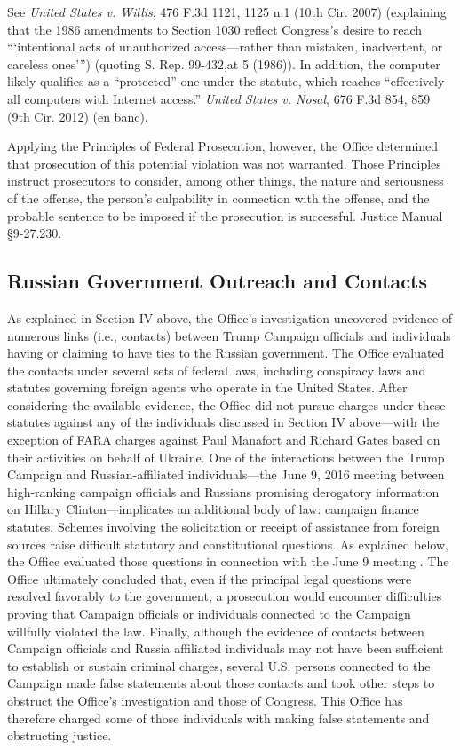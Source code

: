 See \textit{United States v. Willis}, 476 F.3d 1121, 1125 n.1 (10th Cir. 2007) (explaining that the 1986 amendments to Section 1030 reflect Congress's desire to reach ```intentional acts of unauthorized access---rather than mistaken, inadvertent, or careless ones''') (quoting S. Rep. 99-432,at 5 (1986)).
In addition, the computer  likely qualifies as a ``protected'' one under the statute, which reaches ``effectively all computers with Internet access.''
\textit{United States v. Nosal}, 676 F.3d 854, 859 (9th Cir. 2012) (en banc).

Applying the Principles of Federal Prosecution, however, the Office determined that prosecution of this potential violation was not warranted.
Those Principles instruct prosecutors to consider, among other things, the nature and seriousness of the offense, the person's culpability in connection with the offense, and the probable sentence to be imposed if the prosecution is successful.
Justice Manual \S 9-27.230. 

\subsection{Russian Government Outreach and Contacts}
As explained in Section IV above, the Office's investigation uncovered evidence of numerous links (i.e., contacts) between Trump Campaign officials and individuals having or claiming to have ties to the Russian government.
The Office evaluated the contacts under several sets of federal laws, including conspiracy laws and statutes governing foreign agents who operate in the United States.
After considering the available evidence, the Office did not pursue charges under these statutes against any of the individuals discussed in Section IV above---with the exception of FARA charges against Paul Manafort and Richard Gates based on their activities on behalf of Ukraine.
One of the interactions between the Trump Campaign and Russian-affiliated individuals---the June 9, 2016 meeting between high-ranking campaign officials and Russians promising derogatory information on Hillary Clinton---implicates an additional body of law: campaign finance statutes.
Schemes involving the solicitation or receipt of assistance from foreign sources raise difficult statutory and constitutional questions.
As explained below, the Office evaluated those questions in connection with the June 9 meeting .
The Office ultimately concluded that, even if the principal legal questions were resolved favorably to the government, a prosecution would encounter difficulties proving that Campaign officials or individuals connected to the Campaign willfully violated the law.
Finally, although the evidence of contacts between Campaign officials and Russia affiliated individuals may not have been sufficient to establish or sustain criminal charges, several U.S. persons connected to the Campaign made false statements about those contacts and took other steps to obstruct the Office's investigation and those of Congress.
This Office has therefore charged some of those individuals with making false statements and obstructing justice.

